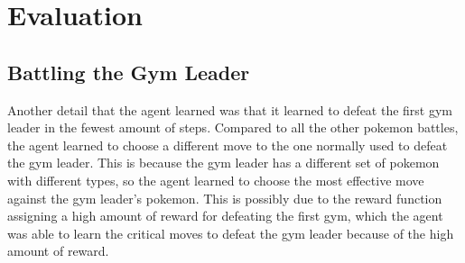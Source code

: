 \section{Evaluation}

\subsection{Battling the Gym Leader}

Another detail that the agent learned was that it learned to defeat the first gym leader in the fewest amount of steps. Compared to all the other pokemon battles, the agent learned to choose a different move to the one normally used to defeat the gym leader. This is because the gym leader has a different set of pokemon with different types, so the agent learned to choose the most effective move against the gym leader's pokemon. This is possibly due to the reward function assigning a high amount of reward for defeating the first gym, which the agent was able to learn the critical moves to defeat the gym leader because of the high amount of reward. 